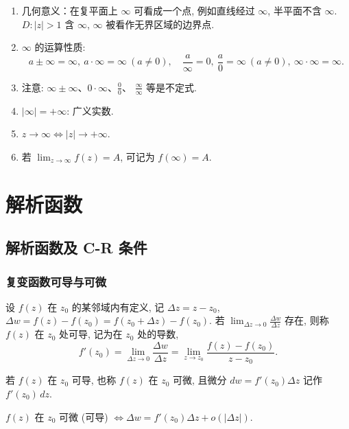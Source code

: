 \documentclass[theorem=false,mathfont=none,openany,sub3section]{easybook}
\begin{document}
\begin{enumerate}
  \item 几何意义：在复平面上 $\infty$ 可看成一个点, 例如直线经过 $\infty$, 半平面不含 $\infty$. $D:\lvert z\rvert>1$ 含 $\infty$, $\infty$ 被看作无界区域的边界点.
  \item $\infty$ 的运算性质:
  \[
  a\pm\infty=\infty,\ a\cdot\infty=\infty\ (a\neq0),\quad
  \frac{a}{\infty}=0,\ \frac{a}{0}=\infty\ (a\neq0),\ \infty\cdot\infty=\infty.
  \]
  \item 注意: $\infty\pm\infty$、$0\cdot\infty$、$\frac{0}{0}$、
  $\frac{\infty}{\infty}$ 等是不定式.
  \item $|\infty|=+\infty$: 广义实数.
  \item $z\to\infty\Leftrightarrow|z|\to+\infty$.
  \item 若 $\lim_{z\to\infty}f(z)=A$, 可记为 $f(\infty)=A$.
\end{enumerate}

\newpage

\chapter{解析函数}

\section{解析函数及 C-R 条件}

\subsection{复变函数可导与可微}

\begin{definition}
  设 $f(z)$ 在 $z_{0}$ 的某邻域内有定义, 记 $\Delta z=z-z_{0}$, $\Delta w=f(z)-f(z_{0})=f(z_{0}+\Delta z)-f(z_{0})$. 若 $\lim_{\Delta z\to0}\frac{\Delta w}{\Delta z}$ 存在, 则称 $f(z)$ 在 $z_{0}$ 处可导, 记为在 $z_{0}$ 处的导数,
  \[
  f'(z_{0})=\lim_{\Delta z\to0}\frac{\Delta w}{\Delta z}=\lim_{z\to z_{0}}\frac{f(z)-f(z_{0})}{z-z_{0}}.
  \]
\end{definition}

\begin{definition}
  若 $f(z)$ 在 $z_{0}$ 可导, 也称 $f(z)$ 在 $z_{0}$ 可微, 且微分 $dw=f'(z_{0})\Delta z$ 记作 $f'(z_{0})\,dz$.
\end{definition}

\begin{theorem}
  $f(z)$ 在 $z_{0}$ 可微 (可导) $\Leftrightarrow \Delta w=f'(z_{0})\Delta z+o(|\Delta z|)$.
\end{theorem}
\end{document}

